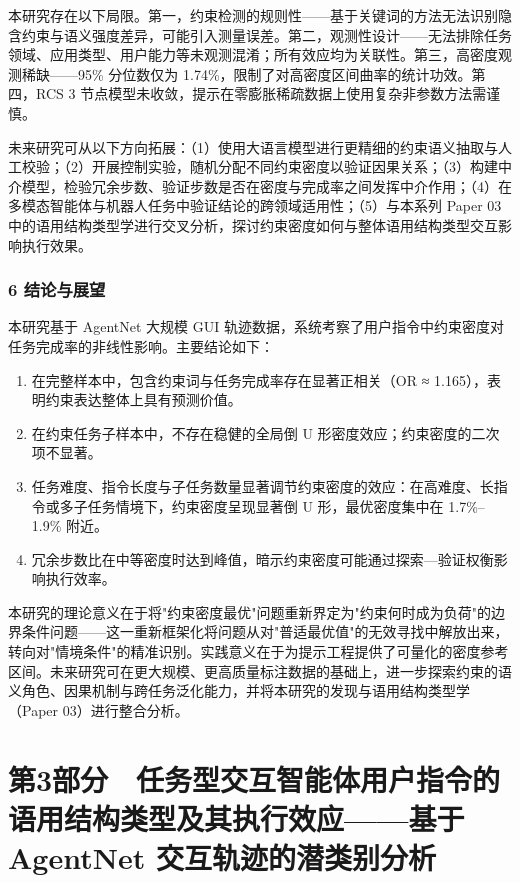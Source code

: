 \documentclass[12pt,a4paper,openany,oneside]{ctexrep}
\begin{document}
本研究存在以下局限。第一，约束检测的规则性——基于关键词的方法无法识别隐含约束与语义强度差异，可能引入测量误差。第二，观测性设计——无法排除任务领域、应用类型、用户能力等未观测混淆；所有效应均为关联性。第三，高密度观测稀缺——95\% 分位数仅为 1.74\%，限制了对高密度区间曲率的统计功效。第四，RCS 3 节点模型未收敛，提示在零膨胀稀疏数据上使用复杂非参数方法需谨慎。

未来研究可从以下方向拓展：（1）使用大语言模型进行更精细的约束语义抽取与人工校验；（2）开展控制实验，随机分配不同约束密度以验证因果关系；（3）构建中介模型，检验冗余步数、验证步数是否在密度与完成率之间发挥中介作用；（4）在多模态智能体与机器人任务中验证结论的跨领域适用性；（5）与本系列 Paper 03 中的语用结构类型学进行交叉分析，探讨约束密度如何与整体语用结构类型交互影响执行效果。

\subsection{6 结论与展望}


本研究基于 AgentNet 大规模 GUI 轨迹数据，系统考察了用户指令中约束密度对任务完成率的非线性影响。主要结论如下：

\begin{enumerate}
\item[1.] 在完整样本中，包含约束词与任务完成率存在显著正相关（OR ≈ 1.165），表明约束表达整体上具有预测价值。
\item[2.] 在约束任务子样本中，不存在稳健的全局倒 U 形密度效应；约束密度的二次项不显著。
\item[3.] 任务难度、指令长度与子任务数量显著调节约束密度的效应：在高难度、长指令或多子任务情境下，约束密度呈现显著倒 U 形，最优密度集中在 1.7\%–1.9\% 附近。
\item[4.] 冗余步数比在中等密度时达到峰值，暗示约束密度可能通过探索—验证权衡影响执行效率。
\end{enumerate}


本研究的理论意义在于将"约束密度最优"问题重新界定为"约束何时成为负荷"的边界条件问题——这一重新框架化将问题从对"普适最优值"的无效寻找中解放出来，转向对"情境条件"的精准识别。实践意义在于为提示工程提供了可量化的密度参考区间。未来研究可在更大规模、更高质量标注数据的基础上，进一步探索约束的语义角色、因果机制与跨任务泛化能力，并将本研究的发现与语用结构类型学（Paper 03）进行整合分析。


\newpage

\chapter{第3部分　任务型交互智能体用户指令的语用结构类型及其执行效应——基于 AgentNet 交互轨迹的潜类别分析}
\end{document}
